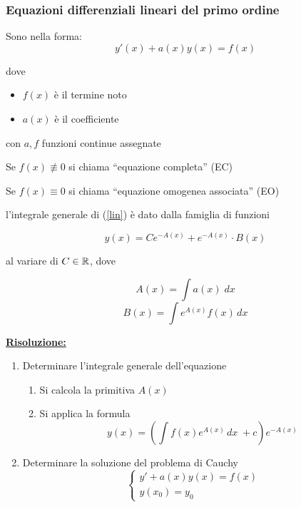 \subsubsection{Equazioni differenziali lineari del primo ordine}
Sono nella forma:
\begin{equation}
    y'(x) + a(x)y(x) =f(x)
    \label{lin}
\end{equation}

dove
\begin{itemize}
    \item $f(x)$ è il termine noto
    \item $a(x)$ è il coefficiente
\end{itemize}

con $a, f$ funzioni continue assegnate
\vspace*{\baselineskip}

Se $f(x) \not\equiv 0$ si chiama “equazione completa” (EC)

Se $f(x) \equiv 0$ si chiama “equazione omogenea associata” (EO)

\begin{theorem}
    l’integrale generale di \textnormal{(\ref{lin})} è dato dalla famiglia di funzioni

    \begin{equation}
            y(x) = Ce^{-A(x)} + e^{-A(x)}\cdot B(x)
    \end{equation}

    al variare di $C \in \mathbb{R}$, dove
    
    \begin{equation}
        A(x) = \int a(x) \; dx
    \end{equation}
    \begin{equation}
        B(x) = \int e^{A(x)}f(x) \, dx
    \end{equation}
\end{theorem}

\underline{\textbf{Risoluzione:}}
\begin{enumerate}
    \item Determinare l’integrale generale dell’equazione
    \begin{enumerate}
        \item Si calcola la primitiva $A(x)$
        \item Si applica la formula
        \begin{equation}
            y(x) = \left( \int f(x)e^{A(x)}\, dx \; + c \right)e^{-A(x)}
        \end{equation}
    \end{enumerate}

    \item Determinare la soluzione del problema di Cauchy 
    \begin{equation}
        \begin{cases}
            y' + a(x)y(x) = f(x) \\
            y(x_0) = y_0
        \end{cases}
    \end{equation}
\end{enumerate}

